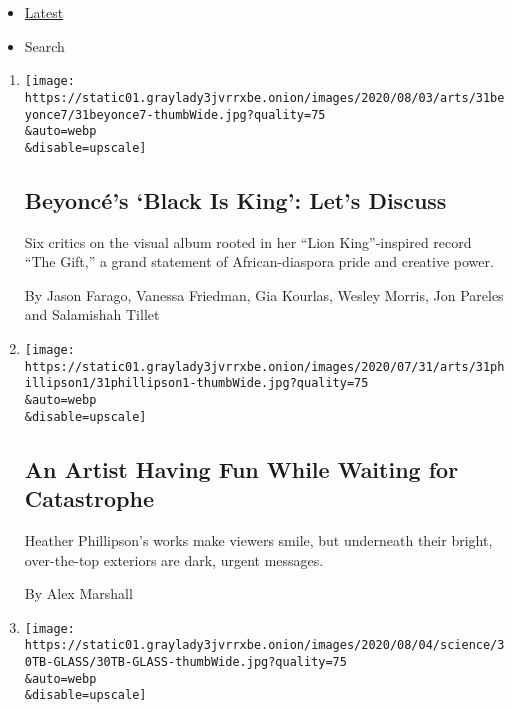 \begin{itemize}
\tightlist
\item
  \protect\hyperlink{stream-panel}{Latest}
\item
  Search
\end{itemize}

\begin{enumerate}
\def\labelenumi{\arabic{enumi}.}
\item
  \href{/2020/07/31/arts/music/beyonce-black-is-king.html}{}

  \texttt{[image: https://static01.graylady3jvrrxbe.onion/images/2020/08/03/arts/31beyonce7/31beyonce7-thumbWide.jpg?quality=75\\\&auto=webp\\\&disable=upscale]}

  \hypertarget{beyoncuxe9s-black-is-king-lets-discuss}{%
  \subsection{Beyoncé's `Black Is King': Let's
  Discuss}\label{beyoncuxe9s-black-is-king-lets-discuss}}

  Six critics on the visual album rooted in her ``Lion King''-inspired
  record ``The Gift,'' a grand statement of African-diaspora pride and
  creative power.

  By Jason Farago, Vanessa Friedman, Gia Kourlas, Wesley Morris, Jon
  Pareles and Salamishah Tillet
\item
  \href{/2020/07/31/arts/design/heather-phillipson-fourth-plinth.html}{}

  \texttt{[image: https://static01.graylady3jvrrxbe.onion/images/2020/07/31/arts/31phillipson1/31phillipson1-thumbWide.jpg?quality=75\\\&auto=webp\\\&disable=upscale]}

  \hypertarget{an-artist-having-fun-while-waiting-for-catastrophe}{%
  \subsection{An Artist Having Fun While Waiting for
  Catastrophe}\label{an-artist-having-fun-while-waiting-for-catastrophe}}

  Heather Phillipson's works make viewers smile, but underneath their
  bright, over-the-top exteriors are dark, urgent messages.

  By Alex Marshall
\item
  \href{/2020/07/31/science/alexandrian-glass-rome.html}{}

  \texttt{[image: https://static01.graylady3jvrrxbe.onion/images/2020/08/04/science/30TB-GLASS/30TB-GLASS-thumbWide.jpg?quality=75\\\&auto=webp\\\&disable=upscale]}


\end{enumerate}

